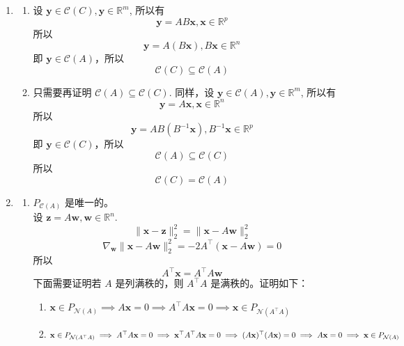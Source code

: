 \documentclass[11pt,letter,notitlepage]{article}
\newcommand{\rank}[1]{ \textbf{rank}  (#1)  }
\begin{document}
\begin{solution}
    \begin{enumerate}
        \item \begin{enumerate}
                  \item 设 $\mathbf{y}\in\mathcal{C}(C), \mathbf{y} \in\mathbb{R}^m$, 所以有
                        $$\mathbf{y}=AB\mathbf{x}, \mathbf{x} \in\mathbb{R}^p$$
                        所以 $$\mathbf{y}=A(B\mathbf{x}), B\mathbf{x} \in \mathbb{R}^n$$
                        即 $\mathbf{y} \in \mathcal{C}(A)$，所以
                        $$\mathcal{C}(C)\subseteq\mathcal{C}(A)$$
                  \item
                        只需要再证明 $\mathcal{C}(A)\subseteq\mathcal{C}(C)$.
                        同样，设 $\mathbf{y}\in\mathcal{C}(A), \mathbf{y} \in\mathbb{R}^m$, 所以有
                        $$\mathbf{y}=A\mathbf{x}, \mathbf{x} \in\mathbb{R}^n$$
                        所以  $$\mathbf{y}=AB(B^{-1}\mathbf{x}), B^{-1}\mathbf{x} \in \mathbb{R}^p$$
                        即 $\mathbf{y} \in \mathcal{C}(C)$，所以
                        $$\mathcal{C}(A)\subseteq\mathcal{C}(C)$$
                        所以 $$\mathcal{C}(C)=\mathcal{C}(A)$$
              \end{enumerate}
        \item \begin{enumerate}
                  \item $P_{\mathcal{C}(A)}$ 是唯一的。\\
                        设 $\mathbf{z}=A\mathbf{w}, \mathbf{w}\in\mathbb{R}^n$.
                        $$\|\mathbf{x}-\mathbf{z}\|_2^2
                            =\|\mathbf{x}-A\mathbf{w}\|_2^2$$
                        $$\nabla_\mathbf{w} \|\mathbf{x}-A\mathbf{w}\|_2^2
                            =-2A^\top (\mathbf{x}-A\mathbf{w}) =0$$
                        所以 $$A^\top \mathbf{x}=A^\top A \mathbf{w}$$
                        下面需要证明若 $A$ 是列满秩的，则 $A^\top A$ 是满秩的。证明如下：
                        \begin{enumerate}
                            \item $\mathbf{x}\in P_{\mathcal{N}(A)} \implies A\mathbf{x}=0 \implies A^\top A \mathbf{x}=0 \implies \mathbf{x}\in P_{\mathcal{N}(A^\top A)}$
                            \item $\mathbf{x}\in P_{\mathcal{N}(A^\top A)} \implies A^\top A \mathbf{x}=0 \implies \mathbf{x}^\top A^\top A \mathbf{x}=0 \\ \implies (A\mathbf{x})^\top (A\mathbf{x})=0 \implies A\mathbf{x}=0 \implies \mathbf{x}\in P_{\mathcal{N}(A)}$

\end{enumerate}
\end{enumerate}
\end{enumerate}
\end{solution}
\end{document}
